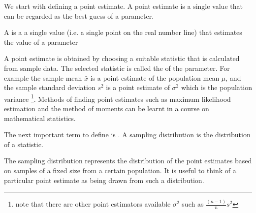We start with defining a point estimate.
A point estimate is a single value that can be regarded as the best guess of a parameter.

\begin{termBox}{
A  is a a single value (i.e. a single point on the real number line) that
estimates the value of a parameter
}
\end{termBox}

A point estimate is obtained by choosing a suitable statistic that is calculated from sample data. 
The selected statistic is called the  of the parameter.
For example the sample mean $\bar{x}$ is a point estimate of the population mean $\mu$,
and the sample standard deviation $s^{2}$ is a point estimate of $\sigma^{2}$ which is the population variance 
\footnote{note that there are other point estimators available $\sigma^{2}$ such as $\frac{(n-1)}{n}s^{2}$}.
Methods of finding point estimates such as maximum likelihood estimation and the method of moments
can be learnt in a course on mathematical statistics.

The next important term to define is .
A sampling distribution is the distribution of a statistic.


\begin{termBox}{
The sampling distribution represents the distribution of the point estimates based on samples of a fixed size from a certain population. It is useful to think of a particular point estimate as being drawn from such a distribution. 
}
\end{termBox}


